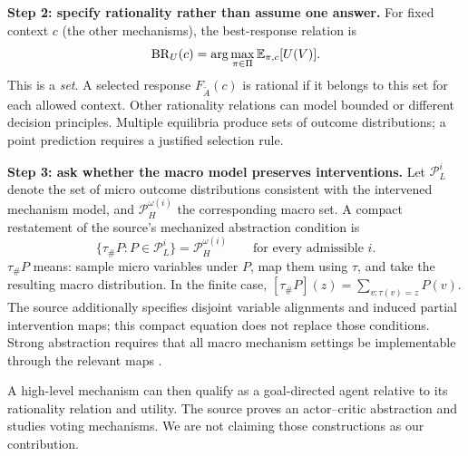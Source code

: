 \documentclass[11pt,letterpaper]{article}
\begin{document}
\textbf{Step 2: specify rationality rather than assume one answer.} For fixed context $c$ (the other mechanisms), the best-response relation is
\begin{equation}
 \mathrm{BR}_{U}(c)=\arg\max_{\pi\in\Pi}\mathbb{E}_{\pi,c}[U(V)].
\end{equation}
This is a \emph{set}. A selected response $F_{\widetilde A}(c)$ is rational if it belongs to this set for each allowed context. Other rationality relations can model bounded or different decision principles. Multiple equilibria produce sets of outcome distributions; a point prediction requires a justified selection rule.

\textbf{Step 3: ask whether the macro model preserves interventions.} Let $\mathcal P_L^i$ denote the set of micro outcome distributions consistent with the intervened mechanism model, and $\mathcal P_H^{\omega(i)}$ the corresponding macro set. A compact restatement of the source's mechanized abstraction condition is
\begin{equation}
 \{\tau_\#P:P\in\mathcal P_L^i\}=\mathcal P_H^{\omega(i)}
 \qquad\text{for every admissible }i.
\end{equation}
$\tau_\#P$ means: sample micro variables under $P$, map them using $\tau$, and take the resulting macro distribution. In the finite case,
$[\tau_\#P](z)=\sum_{v:\tau(v)=z}P(v)$.
The source additionally specifies disjoint variable alignments and induced partial intervention maps; this compact equation does not replace those conditions. Strong abstraction requires that all macro mechanism settings be implementable through the relevant maps \citep[Definitions 13--15, PDF pp. 7--8]{jorgensen2026collective}.

A high-level mechanism can then qualify as a goal-directed agent relative to its rationality relation and utility. The source proves an actor--critic abstraction and studies voting mechanisms. We are not claiming those constructions as our contribution.

\end{document}

